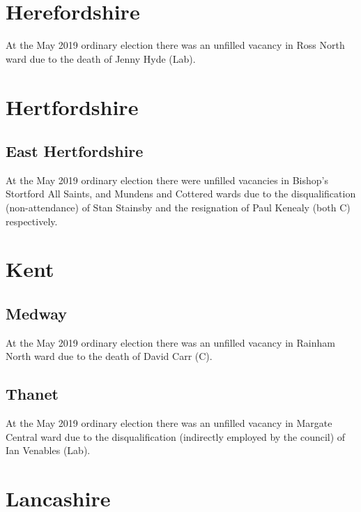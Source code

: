 \documentclass[a4paper,openany]{book}
\begin{document}
\begin{resultsiii}
\section{Herefordshire}

At the May 2019 ordinary election there was an unfilled vacancy in Ross North ward due to the death of Jenny Hyde (Lab).

\section{Hertfordshire}

\subsection*{East Hertfordshire}

At the May 2019 ordinary election there were unfilled vacancies in Bishop's Stortford All Saints, and Mundens and Cottered wards due to the disqualification (non-attendance) of Stan Stainsby and the resignation of Paul Kenealy (both C) respectively.

\section{Kent}

\subsection*{Medway}

At the May 2019 ordinary election there was an unfilled vacancy in Rainham North ward due to the death of David Carr (C).

\subsection*{Thanet}

At the May 2019 ordinary election there was an unfilled vacancy in Margate Central ward due to the disqualification (indirectly employed by the council) of Ian Venables (Lab).

\section{Lancashire}


\end{resultsiii}
\end{document}
